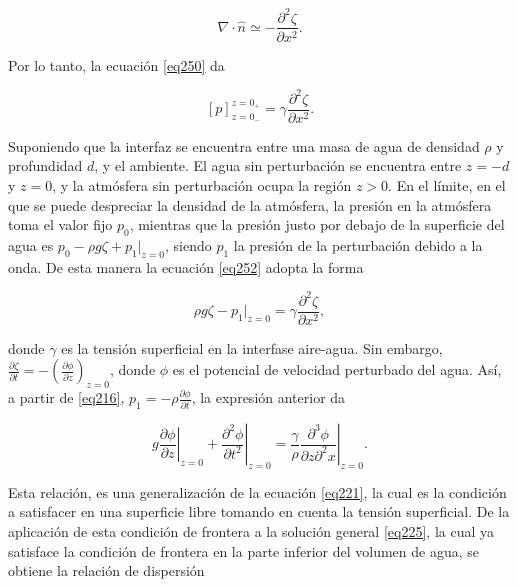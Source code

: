 \begin{equation}\label{eq251}
   \nabla \cdot \hat{n} \simeq - \frac{\partial^2 \zeta}{\partial x^2}.
\end{equation}

\noindent Por lo tanto, la ecuación \ref{eq250} da

\begin{equation}\label{eq252}
    [p]_{z = 0_-}^{z=0_+} = \gamma \frac{\partial^2 \zeta}{\partial x^2}.
\end{equation}

Suponiendo que la interfaz se encuentra entre una masa de agua de densidad $\rho$ y profundidad $d$, y el ambiente. El agua sin perturbación se encuentra entre $z=-d$ y $z=0$, y la atmósfera sin perturbación ocupa la región $z>0$. En el límite, en el que se puede despreciar la densidad de la atmósfera, la presión en la atmósfera toma el valor fijo $p_0$, mientras que la presión justo por debajo de la superficie del agua es $p_0-\rho g \zeta + p_1|_{z = 0}$, siendo $p_1$ la presión de la perturbación debido a la onda. De esta manera la ecuación \ref{eq252} adopta la forma

\begin{equation}\label{eq253}
   \rho g \zeta - p_1|_{z = 0} = \gamma \frac{\partial^2 \zeta}{\partial x^2},
\end{equation}

\noindent donde $\gamma$ es la tensión superficial en la interfase aire-agua. Sin embargo, $\tfrac{\partial \zeta}{\partial t}= -(\tfrac{\partial \phi}{\partial z})_{z=0}$, donde $\phi$ es el potencial de velocidad perturbado del agua. Así, a partir de \ref{eq216}, $p_1=-\rho\frac{\partial \phi}{\partial t}$, la expresión anterior da

\begin{equation}\label{eq254}
    g \left. \frac{\partial \phi}{\partial z}\right|_{z=0} + \left. \frac{\partial^2 \phi}{\partial t^2}\right|_{z=0} = \frac{\gamma}{\rho} \left. \frac{\partial^3 \phi}{\partial z \partial^2 x}\right|_{z=0}.
\end{equation}

\noindent Esta relación, es una generalización de la ecuación \ref{eq221}, la cual es la condición a satisfacer en una superficie libre tomando en cuenta la tensión superficial. De la aplicación de esta condición de frontera a la solución general \ref{eq225}, la cual ya satisface la condición de frontera en la parte inferior del volumen de agua, se obtiene la relación de dispersión

